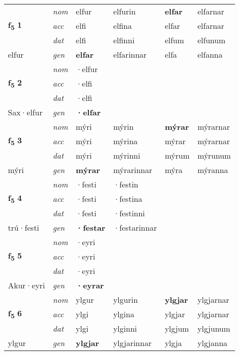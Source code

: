 \begin{longtable}[l]{X>{\footnotesize\itshape}XXXXX}
\multirow{3}{*}{{{\textbf{f{\textsubscript{5}}} \Large{\textbf{1}}}}} & nom & elfur & elfurin & \textbf{elfar} & elfarnar \\*
 & acc & elfi & elfina & elfar & elfarnar \\*
 & dat & elfi & elfinni & elfum & elfunum \\*
 {\footnotesize{elfur}} & gen & \textbf{elfar} & elfarinnar & elfa & elfanna \\
\cmidrule{1-6}

\multirow{3}{*}{{{\textbf{f{\textsubscript{5}}} \Large{\textbf{2}}}}} & nom & ·elfur &  & \textbf{} &  \\*
 & acc & ·elfi &  &  &  \\*
 & dat & ·elfi &  &  &  \\*
 {\footnotesize{Sax\allowbreak ·elfur}} & gen & \textbf{·elfar} &  &  &  \\
\cmidrule{1-6}

\multirow{3}{*}{{{\textbf{f{\textsubscript{5}}} \Large{\textbf{3}}}}} & nom & mýri & mýrin & \textbf{mýrar} & mýrarnar \\*
 & acc & mýri & mýrina & mýrar & mýrarnar \\*
 & dat & mýri & mýrinni & mýrum & mýrunum \\*
 {\footnotesize{mýri}} & gen & \textbf{mýrar} & mýrarinnar & mýra & mýranna \\
\cmidrule{1-6}

\multirow{3}{*}{{{\textbf{f{\textsubscript{5}}} \Large{\textbf{4}}}}} & nom & ·festi & ·festin & \textbf{} &  \\*
 & acc & ·festi & ·festina &  &  \\*
 & dat & ·festi & ·festinni &  &  \\*
 {\footnotesize{trú\allowbreak ·festi}} & gen & \textbf{·festar} & ·festarinnar &  &  \\
\cmidrule{1-6}

\multirow{3}{*}{{{\textbf{f{\textsubscript{5}}} \Large{\textbf{5}}}}} & nom & ·eyri &  & \textbf{} &  \\*
 & acc & ·eyri &  &  &  \\*
 & dat & ·eyri &  &  &  \\*
 {\footnotesize{Akur\allowbreak ·eyri}} & gen & \textbf{·eyrar} &  &  &  \\
\cmidrule{1-6}

\multirow{3}{*}{{{\textbf{f{\textsubscript{5}}} \Large{\textbf{6}}}}} & nom & ylgur & ylgurin & \textbf{ylgjar} & ylgjarnar \\*
 & acc & ylgi & ylgina & ylgjar & ylgjarnar \\*
 & dat & ylgi & ylginni & ylgjum & ylgjunum \\*
 {\footnotesize{ylgur}} & gen & \textbf{ylgjar} & ylgjarinnar & ylgja & ylgjanna \\
\cmidrule{1-6}


\end{longtable}
